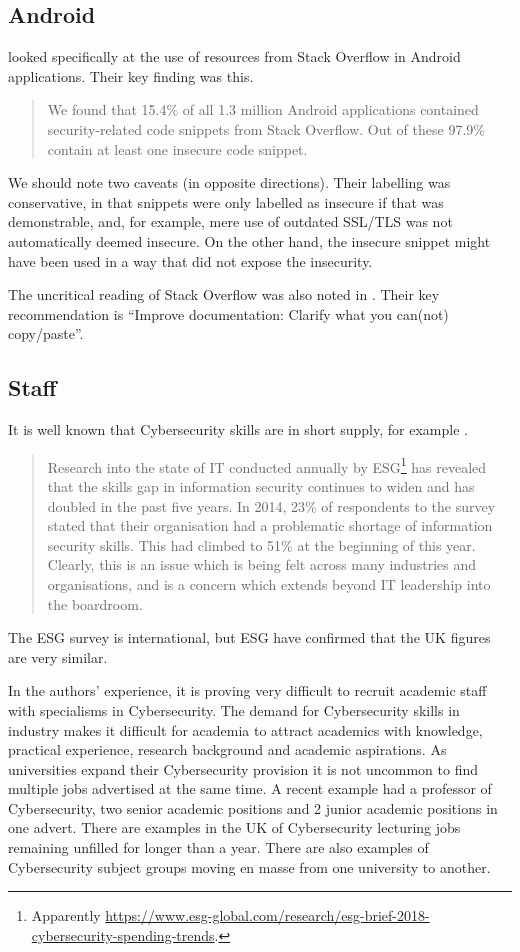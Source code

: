 \documentclass[sigconf,anonymous]{acmart}
\begin{document}
\subsection{Android}\label{sec:Android}
\cite{Fischeretal2017a} looked specifically at the use of resources from Stack Overflow in Android applications. Their key finding was this.
\begin{quote}
We found that 15.4\% of all 1.3 million Android applications
contained security-related code snippets from
Stack Overflow. Out of these 97.9\% contain at least one
insecure code snippet.
\end{quote}
We should note two caveats (in opposite directions). Their labelling was conservative, in that snippets were only labelled as insecure if that was demonstrable, and, for example, mere use of outdated SSL/TLS was not automatically deemed insecure. On the other hand, the insecure snippet might have been used in a way that did not expose the insecurity.
\par
The uncritical reading of Stack Overflow was also noted in \cite[Slide 29]{Votipkaetal2019a}. Their key recommendation  \cite[Slide 32]{Votipkaetal2019a} is ``Improve documentation: Clarify what you can(not) copy/paste''. 
\subsection{Staff}
It is well known that Cybersecurity skills are in short supply, for example \cite{Page2018a}.
\begin{quote}
Research into the state of IT conducted annually by ESG\footnote{Apparently \url{https://www.esg-global.com/research/esg-brief-2018-cybersecurity-spending-trends}.} has revealed that the skills gap in information security continues to widen and has doubled in the past five years. In 2014, 23\% of respondents to the survey stated that their organisation had a problematic shortage of information security skills. This had climbed to 51\% at the beginning of this year. Clearly, this is an issue which is being felt across many industries and organisations, and is a concern which extends beyond IT leadership into the boardroom.
\end{quote}
The ESG survey is international, but ESG have confirmed that the UK figures are very similar.

In the authors' experience, it is proving very difficult to recruit academic staff with specialisms in Cybersecurity. The demand for Cybersecurity skills in industry makes it difficult for academia to attract academics with knowledge, practical experience, research background and academic aspirations. As universities expand their Cybersecurity provision it is not uncommon to find multiple jobs advertised at the same time.  A recent example had a professor of Cybersecurity, two senior academic positions and 2 junior academic positions in one advert. There are examples in the UK of Cybersecurity lecturing jobs remaining unfilled for longer than a year. There are also examples of  Cybersecurity subject groups moving en masse from one university to another.
\end{document}
